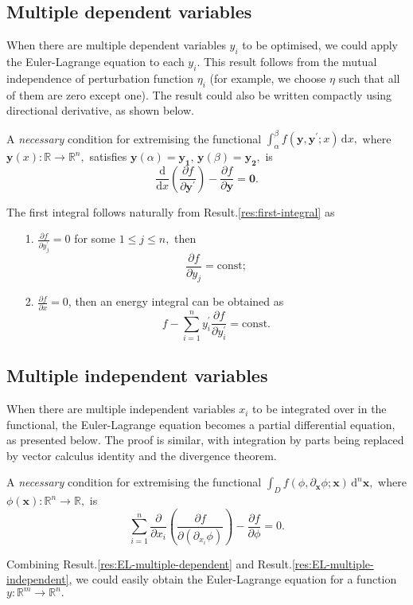 \documentclass{article}
\theoremstyle{nonumberplain}
\begin{document}
\subsection{Multiple dependent variables}
When there are multiple dependent variables $y_i$ to be optimised, we could apply the Euler-Lagrange equation to each $y_i$. This result follows from the mutual independence of perturbation function $\eta_i$ (for example, we choose $\eta $ such that all of them are zero except one). The result could also be written compactly using directional derivative, as shown below. 

\begin{frm-res} \label{res:EL-multiple-dependent}
    A \textit{necessary} condition for extremising the functional 
    \(
        \int_{\alpha }^{\beta } f(\mathbf{y} ,\mathbf{y} ^\prime ; x ) \,\mathrm{d}x, 
    \) 
    where $\mathbf{y} (x) \colon \mathbb{R} \to \mathbb{R}^n,$ 
    satisfies $\mathbf{y} (\alpha ) = \mathbf{y_1} , \, \mathbf{y}(\beta ) = \mathbf{y_2},$
    is
    \[
        \frac{\mathrm{d}}{\mathrm{d}x} \left(\frac{\partial f}{\partial \mathbf{y} ^\prime } \right)
        - \frac{\partial f}{\partial \mathbf{y} } =\textbf{0} .
    \]
\end{frm-res}
The first integral follows naturally from Result.\ref{res:first-integral} as 
\begin{itemize}
    \item[1.] \(\frac{\partial f}{\partial y_j^\prime } =0   \) for some $1 \leq  j \leq  n,$ then 
    \[
        \frac{\partial f}{\partial y_j} = \text{const};
    \] 
    \item[2.] \(\frac{\partial f}{\partial x} =0\), then an energy integral can be obtained as
    \[
        f - \sum\limits_{i=1}^{n} y_i^\prime  \frac{\partial f}{\partial y_i^\prime } = \text{const}.
    \]
\end{itemize}

\subsection{Multiple independent variables}
When there are multiple independent variables $x_i$ to be integrated over in the functional, the Euler-Lagrange equation becomes a partial differential equation, as presented below. The proof is similar, with integration by parts being replaced by vector calculus identity and the divergence theorem. 
\begin{frm-res} \label{res:EL-multiple-independent}
    A \textit{necessary} condition for extremising the functional 
    \(
        \int_D f(\phi ,\partial_{\mathbf{x}} \phi ; \mathbf{x} ) \,\mathrm{d}^n \mathbf{x},
    \) 
    where $\phi(\mathbf{x} )
        \colon \mathbb{R}^n \to \mathbb{R},
    $ 
    is
    \[
        \sum\limits_{i=1}^{n} \frac{\partial }{\partial x_i}  \left(\frac{\partial f}{\partial \left(\partial_{x_i} \phi \right)} \right)
        - \frac{\partial f}{\partial \phi } =0.
    \]
\end{frm-res}
Combining Result.\ref{res:EL-multiple-dependent} and Result.\ref{res:EL-multiple-independent}, we could easily obtain the Euler-Lagrange equation for a function $y
    \colon \mathbb{R}^m \to \mathbb{R}^n. 
$
\end{document}

